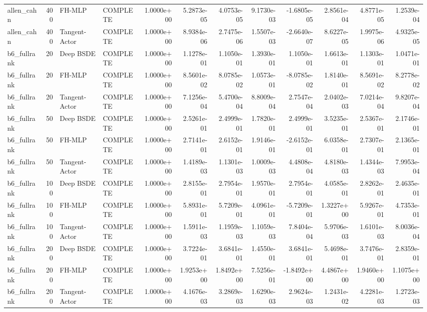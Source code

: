 \begin{tabular}{lrllrrrrrrrr}
allen\_cahn & 400 & FH-MLP & COMPLETE & 1.0000e+00 & 5.2873e-05 & 4.0753e-05 & 9.1730e-03 & -1.6805e-05 & 2.8561e-04 & 4.8771e-05 & 1.2539e-04 \\
allen\_cahn & 400 & Tangent-Actor & COMPLETE & 1.0000e+00 & 8.9384e-06 & 2.7475e-06 & 1.5507e-03 & -2.6640e-07 & 8.6227e-05 & 1.9975e-06 & 4.9325e-05 \\
b6\_fullrank & 20 & Deep BSDE & COMPLETE & 1.0000e+00 & 1.1278e-01 & 1.1050e-01 & 1.3930e-01 & 1.1050e-01 & 1.6613e-01 & 1.1303e-01 & 1.0471e-01 \\
b6\_fullrank & 20 & FH-MLP & COMPLETE & 1.0000e+00 & 8.5601e-02 & 8.0785e-02 & 1.0573e-01 & -8.0785e-02 & 1.8140e-01 & 8.5691e-02 & 8.2778e-02 \\
b6\_fullrank & 20 & Tangent-Actor & COMPLETE & 1.0000e+00 & 7.1256e-04 & 5.4700e-04 & 8.8009e-04 & 2.7547e-04 & 2.0402e-03 & 7.0214e-04 & 9.8207e-04 \\
b6\_fullrank & 50 & Deep BSDE & COMPLETE & 1.0000e+00 & 2.5261e-01 & 2.4999e-01 & 1.7820e-01 & 2.4999e-01 & 3.5235e-01 & 2.5367e-01 & 2.1746e-01 \\
b6\_fullrank & 50 & FH-MLP & COMPLETE & 1.0000e+00 & 2.7141e-01 & 2.6152e-01 & 1.9146e-01 & -2.6152e-01 & 6.0358e-01 & 2.7307e-01 & 2.1365e-01 \\
b6\_fullrank & 50 & Tangent-Actor & COMPLETE & 1.0000e+00 & 1.4189e-03 & 1.1301e-03 & 1.0009e-03 & 4.4808e-04 & 4.8180e-03 & 1.4344e-03 & 7.9953e-04 \\
b6\_fullrank & 100 & Deep BSDE & COMPLETE & 1.0000e+00 & 2.8155e-01 & 2.7954e-01 & 1.9570e-01 & 2.7954e-01 & 4.0585e-01 & 2.8262e-01 & 2.4635e-01 \\
b6\_fullrank & 100 & FH-MLP & COMPLETE & 1.0000e+00 & 5.8931e-01 & 5.7209e-01 & 4.0961e-01 & -5.7209e-01 & 1.3227e+00 & 5.9267e-01 & 4.7353e-01 \\
b6\_fullrank & 100 & Tangent-Actor & COMPLETE & 1.0000e+00 & 1.5911e-03 & 1.1959e-03 & 1.1059e-03 & 7.8404e-04 & 5.9706e-03 & 1.6101e-03 & 8.0036e-04 \\
b6\_fullrank & 200 & Deep BSDE & COMPLETE & 1.0000e+00 & 3.7224e-01 & 3.6841e-01 & 1.4550e-01 & 3.6841e-01 & 5.4698e-01 & 3.7476e-01 & 2.8359e-01 \\
b6\_fullrank & 200 & FH-MLP & COMPLETE & 1.0000e+00 & 1.9253e+00 & 1.8492e+00 & 7.5256e-01 & -1.8492e+00 & 4.4867e+00 & 1.9460e+00 & 1.1075e+00 \\
b6\_fullrank & 200 & Tangent-Actor & COMPLETE & 1.0000e+00 & 4.1676e-03 & 3.2869e-03 & 1.6290e-03 & 2.9624e-03 & 1.2431e-02 & 4.2281e-03 & 1.2723e-03 \\

\end{tabular}
